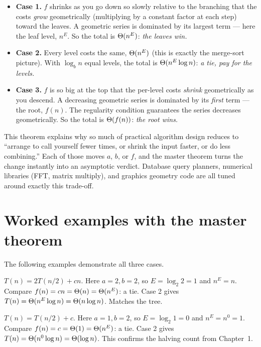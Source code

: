 \begin{itemize}
\item \textbf{Case 1.} $f$ shrinks as you go down so slowly relative to the
branching that the costs \emph{grow} geometrically (multiplying by a constant factor at each step) toward the leaves. A geometric
series is dominated by its largest term --- here the leaf level, $n^{E}$. So the
total is $\Theta(n^{E})$: \emph{the leaves win.}
\item \textbf{Case 2.} Every level costs the same, $\Theta(n^{E})$ (this is exactly
the merge-sort picture). With $\log_b n$ equal levels, the total is
$\Theta(n^{E}\log n)$: \emph{a tie, pay for the levels.}
\item \textbf{Case 3.} $f$ is so big at the top that the per-level costs
\emph{shrink} geometrically as you descend. A decreasing geometric series is
dominated by its \emph{first} term --- the root, $f(n)$. The regularity condition
guarantees the series decreases geometrically. So
the total is $\Theta(f(n))$: \emph{the root wins.}
\end{itemize}

\begin{aestheticbox}
This theorem explains why so much of practical algorithm design reduces to
``arrange to call yourself fewer times, or shrink the input faster, or do less
combining.'' Each of those moves $a$, $b$, or $f$, and the master theorem turns
the change instantly into an asymptotic verdict. Database query planners,
numerical libraries (FFT, matrix multiply), and graphics geometry code are all
tuned around exactly this trade-off.
\end{aestheticbox}

\section{Worked examples with the master theorem}

The following examples demonstrate all three cases.

\begin{example}
$T(n)=2T(n/2)+cn$. Here $a=2,b=2$, so $E=\log_2 2 = 1$ and $n^{E}=n$. Compare
$f(n)=cn=\Theta(n)=\Theta(n^{E})$: a tie. Case 2 gives
$T(n)=\Theta(n^{E}\log n)=\Theta(n\log n)$. Matches the tree.
\end{example}

\begin{example}[Binary search --- Case 2 with $E=0$]
$T(n)=T(n/2)+c$. Here $a=1,b=2$, so $E=\log_2 1 = 0$ and $n^{E}=n^0=1$. Compare
$f(n)=c=\Theta(1)=\Theta(n^{E})$: a tie. Case 2 gives
$T(n)=\Theta(n^{0}\log n)=\Theta(\log n)$. This confirms the halving count from Chapter~1.
\end{example}

